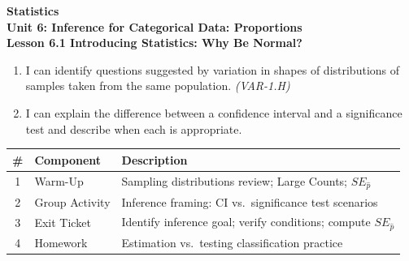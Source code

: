 \documentclass[10pt]{article}
\begin{document}
\vspace{-0.8in}

\begin{center}
  {\color{white}\textbf{\LARGE Statistics}}\\[4pt]
  {\color{skymid}\large\textbf{Unit 6: Inference for Categorical Data: Proportions}}\\[6pt]
  {\color{white}\textbf{\large Lesson 6.1 \quad Introducing Statistics: Why Be Normal?}}
\end{center}

\vspace{0.22in}
\namedateperiod
\vspace{0.18in}

\begin{learningtargetbox}
\small
\begin{enumerate}[leftmargin=1.5em, itemsep=5pt]
  \item I can identify questions suggested by variation in shapes of distributions of samples
        taken from the same population. \textit{(VAR-1.H)}
  \item I can explain the difference between a confidence interval and a significance test and
        describe when each is appropriate.
\end{enumerate}
\end{learningtargetbox}

\vspace{0.14in}

\begin{tocbox}
\small
\renewcommand{\arraystretch}{1.5}
\begin{tabularx}{\linewidth}{@{} c l X @{}}
\rowcolor{sky}
\textbf{\#} & \textbf{Component} & \textbf{Description} \\
\midrule
1 & Warm-Up        & Sampling distributions review; Large Counts; $SE_{\hat p}$ \\
2 & Group Activity & Inference framing: CI vs.\ significance test scenarios \\
3 & Exit Ticket    & Identify inference goal; verify conditions; compute $SE_{\hat p}$ \\
4 & Homework       & Estimation vs.\ testing classification practice \\
\end{tabularx}
\end{tocbox}
\end{document}

